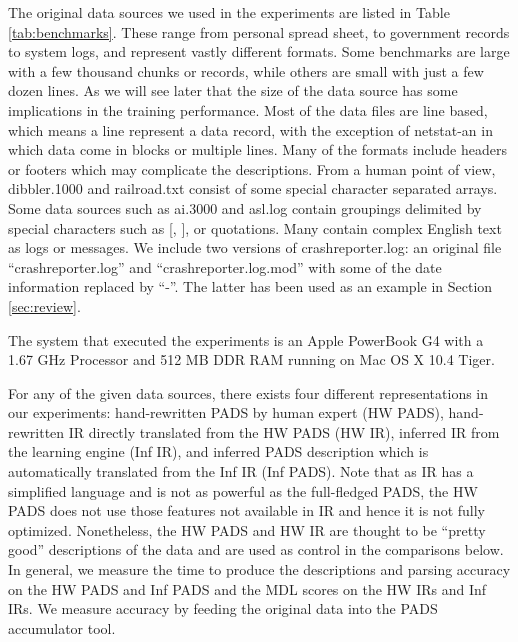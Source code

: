 The original data sources we used in the experiments are listed in Table \ref{tab:benchmarks}.
These range from personal spread sheet, to government records to system logs, and 
represent vastly different formats. Some benchmarks are large with a few thousand
chunks or records, while others are small with just a few dozen lines. As we will see later
that the size of the data source has some implications in the training performance.
Most of the data files are line based, which means a line represent a data record, with
the exception of netstat-an in which data come in blocks or multiple lines.
Many of the formats include headers or footers which may complicate the descriptions.
From a human point of view, dibbler.1000 and railroad.txt consist of some special
character separated arrays. Some data sources such as ai.3000 and asl.log
contain groupings delimited by special characters such as [, ], or quotations.
Many contain complex English text as logs or messages.
We include two versions of crashreporter.log: an original file ``crashreporter.log''
and ``crashreporter.log.mod'' with some of the date information replaced by ``-''. 
The latter has been used as an example in Section \ref{sec:review}. 

The system that executed the experiments is an 
Apple PowerBook G4 with a 1.67 GHz Processor and 512 MB DDR RAM 
running on Mac OS X 10.4 Tiger. 


For any of the given data sources, there exists four different representations in 
our experiments: hand-rewritten PADS by human expert (HW PADS), hand-rewritten IR directly
translated from the HW PADS (HW IR), inferred IR from the learning engine (Inf IR), and
inferred PADS description which is automatically translated from the Inf IR (Inf PADS). 
Note that as IR has a simplified language and is not as powerful as the full-fledged
PADS, the HW PADS does not use those features not available in IR and hence it is
not fully optimized. 
Nonetheless, the HW PADS and HW IR are thought to be ``pretty good'' descriptions of
the data and are used as control in the comparisons below. 
In general, we measure the time to produce the descriptions and parsing accuracy on
the HW PADS and Inf PADS and the MDL scores on the HW IRs and Inf IRs.
We measure accuracy by feeding the original data into the PADS accumulator tool.

